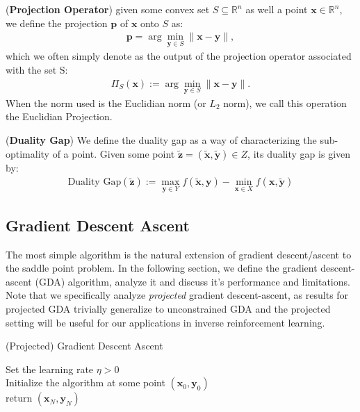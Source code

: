 \begin{definition}
    (\textbf{Projection Operator}) given some convex set $S \subseteq \mathbb{R}^n$ as well a point $\bm{x} \in \mathbb{R}^n$, we define the projection $\bm{p}$ of $\bm{x}$ onto $S$ as:
    \begin{align*}
        \bm{p} = \arg \min_{\bm{y} \in S} \| \bm{x} - \bm{y} \|,
    \end{align*}
    which we often simply denote as the output of the projection operator associated with the set S: 
    \begin{align*}
        \Pi_S(\bm{x}) := \arg \min_{\bm{y} \in S} \| \bm{x} - \bm{y} \|.
    \end{align*}
    When the norm used is the Euclidian norm (or $L_2$ norm), we call this operation the Euclidian Projection.
\end{definition}

\begin{definition}
    (\textbf{Duality Gap}) We define the duality gap as a way of characterizing the sub-optimality of a point. Given some point $\tilde{\bm{z}}=(\tilde{\bm{x}},\tilde{\bm{y}})\in Z$, its duality gap is given by:
    \begin{align*}
        \text{Duality Gap}(\tilde{\bm{z}}) := \max_{\bm{y} \in Y} f(\tilde{\bm{x}},\bm{y}) - \min_{\bm{x} \in X} f(\bm{x},\tilde{\bm{y}})
    \end{align*}
\end{definition}


\subsection{Gradient Descent Ascent} \label{sec:GDA}

The most simple algorithm is the natural extension of gradient descent/ascent to the saddle point problem. In the following section, we define the gradient descent-ascent (GDA) algorithm, analyze it and discuss it's performance and limitations. Note that we specifically analyze \textit{projected} gradient descent-ascent, as results for projected GDA trivially generalize to unconstrained GDA and the projected setting will be useful for our applications in inverse reinforcement learning.


\begin{algorithm}[H]
    \label{alg:projGDA}
    \SetAlgoLined
    \caption{(Projected) Gradient Descent Ascent}
    Set the learning rate $\eta >0$ \\
    Initialize the algorithm at some point $(\bm{x}_0,\bm{y}_0)$  \\
    return $(\bm{x}_N,\bm{y}_N)$
\end{algorithm}

